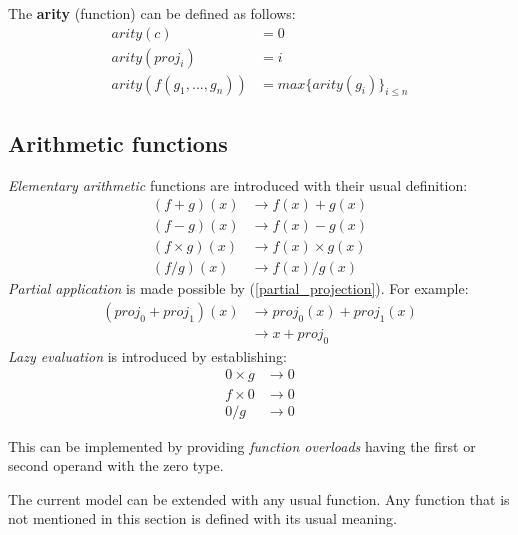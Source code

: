 \documentclass[a4paper]{article}
\begin{document}
The \textbf{arity} (function) can be defined as follows:
\begin{equation}
\begin{split}
	arity(c) &= 0 \\
	arity(proj_i) &= i \\
	arity(f(g_1,...,g_n)) &= max\{arity(g_i)\}_{i \leq n}
\end{split}
\end{equation}

\subsection{Arithmetic functions}

\textit{Elementary arithmetic} functions are introduced with their usual definition:
\begin{equation}
\begin{split}
	(f + g)(x)      &\rightarrow f(x) + g(x) \\
	(f - g)(x)      &\rightarrow f(x) - g(x) \\
	(f \times g)(x) &\rightarrow f(x) \times g(x) \\
	(f / g)(x)      &\rightarrow f(x) / g(x)
\end{split}
\end{equation}
\textit{Partial application} is made possible by (\ref{partial_projection}). For example:
\begin{equation}
\begin{split}
	(proj_0 + proj_1)(x) &\rightarrow proj_0(x) + proj_1(x) \\
	                     &\rightarrow x + proj_0
\end{split}
\end{equation}
\textit{Lazy evaluation} is introduced by establishing:
\begin{equation}
\begin{split}
	0 \times g &\rightarrow 0\\
	f \times 0 &\rightarrow 0\\
	0 / g      &\rightarrow 0
\end{split}
\end{equation}
\begin{mdframed}
This can be implemented by providing \textit{function overloads} having the first or second operand with the zero type.
\end{mdframed}

The current model can be extended with any usual function.
Any function that is not mentioned in this section is defined with its usual meaning.
\end{document}
